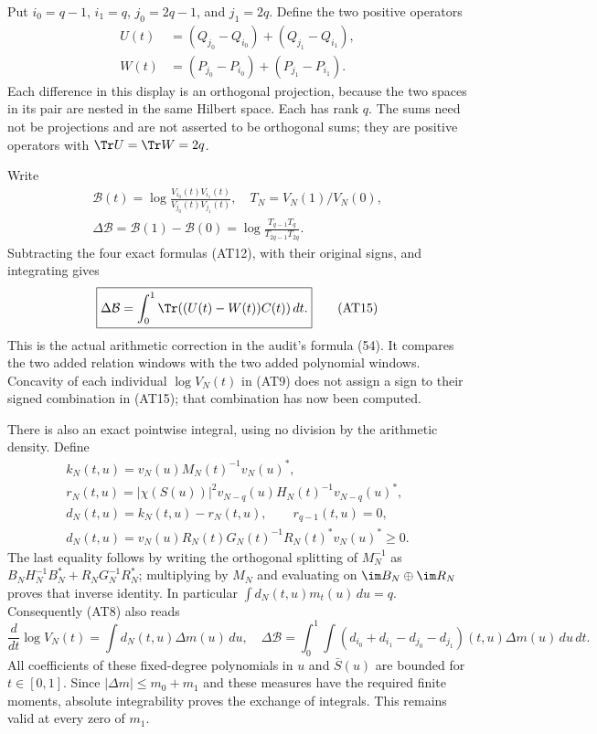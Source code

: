 Put $i_0=q-1$, $i_1=q$, $j_0=2q-1$, and $j_1=2q$.
Define the two positive operators
\[
 \begin{split}
 U(t)&=(Q_{j_0}-Q_{i_0})+(Q_{j_1}-Q_{i_1}),\\
 W(t)&=(P_{j_0}-P_{i_0})+(P_{j_1}-P_{i_1}).    \end{split}
 \tag{AT13}
\]
Each difference in this display is an orthogonal projection,
because the two spaces in its pair are nested in the same
Hilbert space. Each has rank $q$. The sums need not be
projections and are not asserted to be orthogonal sums; they
are positive operators with $\Tr U=\Tr W=2q$.

Write
\[
 \begin{gathered}
 \mathcal B(t)=\log\frac{V_{i_0}(t)V_{i_1}(t)}{V_{j_0}(t)V_{j_1}(t)},
 \quad T_N=V_N(1)/V_N(0),\\
 \Delta\mathcal B=\mathcal B(1)-\mathcal B(0)
 =\log\frac{T_{q-1}T_q}{T_{2q-1}T_{2q}}.       \end{gathered}
 \tag{AT14}
\]
Subtracting the four exact formulas (AT12), with their original
signs, and integrating gives
\[
 \boxed{\displaystyle
 \Delta\mathcal B=\int_0^1\Tr((U(t)-W(t))C(t))\,dt .}
                                                        \tag{AT15}
\]
This is the actual arithmetic correction in the audit's formula
(54). It compares the two added relation windows with the two
added polynomial windows. Concavity of each individual
$\log V_N(t)$ in (AT9) does not assign a sign to their signed
combination in (AT15); that combination has now been computed.

There is also an exact pointwise integral, using no division by
the arithmetic density. Define
\[
 \begin{gathered}
 k_N(t,u)=v_N(u)M_N(t)^{-1}v_N(u)^*,\\
 r_N(t,u)=|\chi(S(u))|^2
 v_{N-q}(u)H_N(t)^{-1}v_{N-q}(u)^*,\\
 d_N(t,u)=k_N(t,u)-r_N(t,u),\qquad r_{q-1}(t,u)=0,\\
 d_N(t,u)=v_N(u)R_N(t)G_N(t)^{-1}R_N(t)^*v_N(u)^*\ge0.
                                                        \end{gathered}
 \tag{AT16}
\]
The last equality follows by writing the orthogonal splitting
of $M_N^{-1}$ as
$B_NH_N^{-1}B_N^*+R_NG_N^{-1}R_N^*$; multiplying by $M_N$
and evaluating on $\im B_N\oplus\im R_N$ proves that inverse
identity. In particular $\int d_N(t,u)m_t(u)\,du=q$.
Consequently (AT8) also reads
\[
 \frac{d}{dt}\log V_N(t)=\int d_N(t,u)\Delta m(u)\,du,
\quad
 \Delta\mathcal B=\int_0^1\int
 (d_{i_0}+d_{i_1}-d_{j_0}-d_{j_1})(t,u)\Delta m(u)\,du\,dt.
                                                        \tag{AT17}
\]
All coefficients of these fixed-degree polynomials in $u$ and
$\bar S(u)$ are bounded for $t\in[0,1]$. Since
$|\Delta m|\le m_0+m_1$ and these measures have the required
finite moments, absolute integrability proves the exchange of
integrals. This remains valid at every zero of $m_1$.

